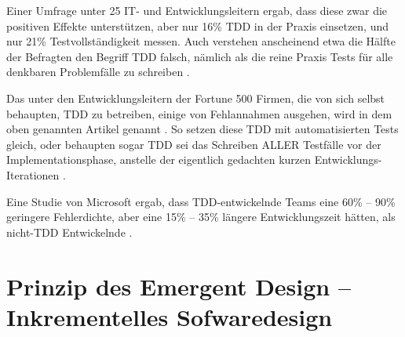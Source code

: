 
Einer Umfrage unter 25 IT- und Entwicklungsleitern ergab, dass diese zwar die positiven Effekte unterstützen, aber nur 16\% TDD in der Praxis einsetzen, und nur 21\% Testvollständigkeit messen. Auch verstehen anscheinend etwa die Hälfte der Befragten den Begriff TDD falsch, nämlich als die reine Praxis Tests für alle denkbaren Problemfälle zu schreiben \citep{stelligent_inc_stelligent_2007}.

Das unter den Entwicklungsleitern der Fortune 500 Firmen, die von sich selbst behaupten, TDD zu betreiben, einige von Fehlannahmen ausgehen, wird in dem oben genannten Artikel genannt \citep{janzen_does_2008}. So setzen diese TDD mit automatisierten Tests gleich, oder behaupten sogar TDD sei das Schreiben ALLER Testfälle vor der Implementationsphase, anstelle der eigentlich gedachten kurzen Entwicklungs-Iterationen \citep{janzen_does_2008}.


Eine Studie von Microsoft ergab, dass TDD-entwickelnde Teams eine 60\% -- 90\% geringere Fehlerdichte, aber eine 15\% -- 35\% längere Entwicklungszeit hätten, als nicht-TDD Entwickelnde \citep{nagappan_realizing_2008}.



\section{Prinzip des Emergent Design -- Inkrementelles Sofwaredesign}
\label{sec:tddEmergent}





